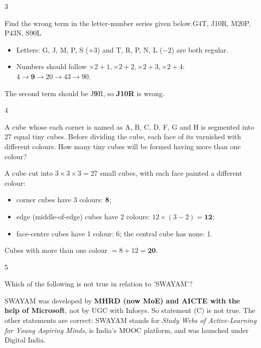 \begin{question}{3}
{Find the wrong term in the letter-number series given below.\newline G4T, J10R, M20P, P43N, S90L\par}
\begin{explain}
\begin{itemize}
\item Letters: G, J, M, P, S (+3) and T, R, P, N, L ($-2$) are both regular.
\item Numbers should follow $\times2+1, \times2+2, \times2+3, \times2+4$: $4\rightarrow\mathbf{9}\rightarrow20\rightarrow43\rightarrow90$.
\end{itemize}
The second term should be J\textbf{9}R, so \textbf{J10R} is wrong.
\end{explain}
\end{question}

\begin{question}{4}
{A cube whose each corner is named as A, B, C, D, F, G and H is segmented into 27 equal tiny cubes. Before dividing the cube, each face of its varnished with different colours. How many tiny cubes will be formed having more than one colour?\par}
\begin{explain}
A cube cut into $3\times3\times3=27$ small cubes, with each face painted a different colour:
\begin{itemize}
\item corner cubes have 3 colours: \textbf{8};
\item edge (middle-of-edge) cubes have 2 colours: $12\times(3-2)=\mathbf{12}$;
\item face-centre cubes have 1 colour: 6; the central cube has none: 1.
\end{itemize}
Cubes with more than one colour $=8+12=\mathbf{20}$.
\end{explain}
\end{question}

\begin{question}{5}
{Which of the following is not true in relation to 'SWAYAM'?\par}
\begin{explain}
SWAYAM was developed by \textbf{MHRD (now MoE) and AICTE with the help of Microsoft}, not by UGC with Infosys. So statement (C) is not true. The other statements are correct: SWAYAM stands for \emph{Study Webs of Active-Learning for Young Aspiring Minds}, is India's MOOC platform, and was launched under Digital India.
\end{explain}
\end{question}

